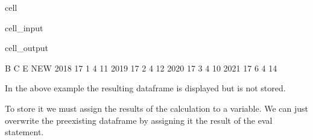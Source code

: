 \documentclass[letterpaper,10pt,english]{jupyterBook}
\begin{document}
\begin{sphinxuseclass}{cell}\begin{sphinxVerbatimInput}

\begin{sphinxuseclass}{cell_input}
\begin{sphinxVerbatim}[commandchars=\\\{\}]
\end{sphinxVerbatim}

\end{sphinxuseclass}\end{sphinxVerbatimInput}
\begin{sphinxVerbatimOutput}

\begin{sphinxuseclass}{cell_output}
\begin{sphinxVerbatim}[commandchars=\\\{\}]
       B  C  E  NEW
2018  17  1  4   11
2019  17  2  4   12
2020  17  3  4   10
2021  17  6  4   14
\end{sphinxVerbatim}

\end{sphinxuseclass}\end{sphinxVerbatimOutput}

\end{sphinxuseclass}
\sphinxAtStartPar
In the above example the resulting dataframe is displayed but is not stored.

\sphinxAtStartPar
To store it we must  assign the results of the calculation to a variable.  We can just overwrite the pre\sphinxhyphen{}existing dataframe by assigning it the result of the eval statement.
\end{document}
